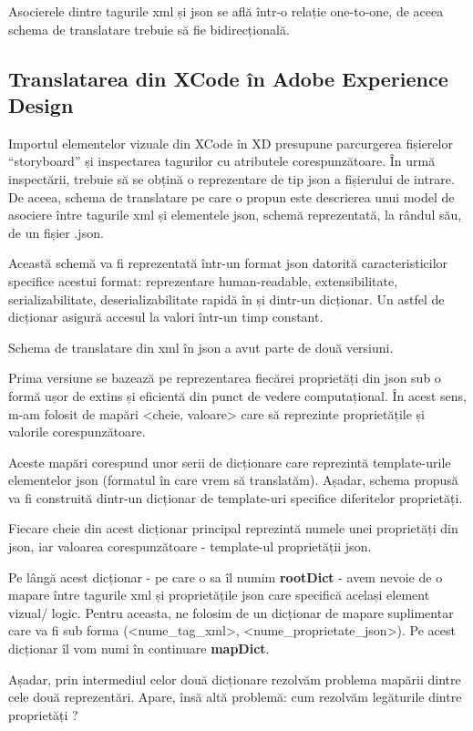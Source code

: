 Asocierele dintre tagurile xml și json se află într-o relație one-to-one, de aceea schema de translatare trebuie să fie bidirecțională.

\subsection{Translatarea din XCode în Adobe Experience Design}

Importul elementelor vizuale din XCode în XD presupune parcurgerea fișierelor “storyboard” și inspectarea tagurilor cu atributele corespunzătoare. În urmă inspectării, trebuie să se obțină o reprezentare de tip json a fișierului de intrare.  De aceea, schema de translatare pe care o propun este descrierea unui model de asociere între tagurile xml și elementele json, schemă reprezentată, la rândul său, de un fișier .json.  

Această schemă va fi reprezentată într-un format json datorită caracteristicilor specifice acestui format: reprezentare human-readable, extensibilitate, serializabilitate, deserializabilitate rapidă în și dintr-un dicționar. Un astfel de dicționar asigură accesul la valori într-un timp constant.

Schema de translatare din xml în json a avut parte de două versiuni. 

Prima versiune se bazează pe reprezentarea fiecărei proprietăți din json sub o formă ușor de extins și eficientă din punct de vedere computațional. În acest sens, m-am folosit de mapări <cheie, valoare> care să reprezinte proprietățile și valorile corespunzătoare.

Aceste mapări corespund unor serii de dicționare care reprezintă template-urile elementelor json (formatul în care vrem să translatăm). Așadar, schema propusă va fi construită dintr-un dicționar de template-uri specifice diferitelor proprietăți. 

Fiecare cheie din acest dicționar principal reprezintă numele unei proprietăți din json, iar valoarea corespunzătoare - template-ul proprietății json. 

Pe lângă acest dicționar - pe care o sa îl numim \textbf{rootDict} - avem nevoie de o mapare între tagurile xml și proprietățile json care specifică același element vizual/ logic. Pentru aceasta, ne folosim de un dicționar de mapare suplimentar care va fi sub forma (<nume_tag_xml>,  <nume_proprietate_json>). Pe acest dicționar îl vom numi în continuare \textbf{mapDict}.

Așadar, prin intermediul celor două dicționare rezolvăm problema mapării dintre cele două reprezentări. Apare, însă altă problemă: cum rezolvăm legăturile dintre proprietăți ?


